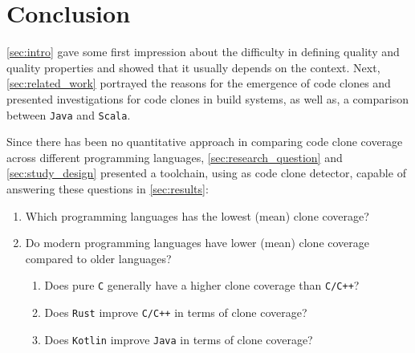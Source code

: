 
\section{Conclusion}
\label{sec:conclusion}

\autoref{sec:intro} gave some first impression about the difficulty in defining quality and quality properties and showed that it usually depends on the context. Next, \autoref{sec:related_work} portrayed the reasons for the emergence of code clones and presented investigations for code clones in build systems, as well as, a comparison between \texttt{Java} and \texttt{Scala}.

Since there has been no quantitative approach in comparing code clone coverage across different programming languages, \autoref{sec:research_question} and \autoref{sec:study_design} presented a toolchain, using \teamscale{} as code clone detector, capable of answering these questions in \autoref{sec:results}:
\begin{enumerate}
	\item Which programming languages has the lowest (mean) clone coverage?
	
	
	\item Do modern programming languages have lower (mean) clone coverage compared to older languages?
	
	
	\begin{enumerate}
		\item Does pure \texttt{C} generally have a higher clone coverage than \texttt{C/C++}?
		
		
		\item Does \texttt{Rust} improve \texttt{C/C++} in terms of clone coverage?
		
		
		\item Does \texttt{Kotlin} improve \texttt{Java} in terms of clone coverage?
		
	\end{enumerate}
\end{enumerate}
